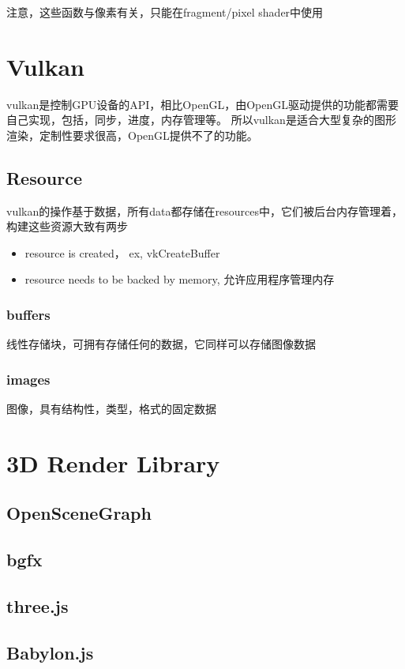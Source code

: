 注意，这些函数与像素有关，只能在fragment/pixel shader中使用

\section{Vulkan}

vulkan是控制GPU设备的API，相比OpenGL，由OpenGL驱动提供的功能都需要自己实现，包括，同步，进度，内存管理等。
所以vulkan是适合大型复杂的图形渲染，定制性要求很高，OpenGL提供不了的功能。

\subsection{Resource}

vulkan的操作基于数据，所有data都存储在resources中，它们被后台内存管理着，构建这些资源大致有两步
\begin{itemize}
    \item {resource is created， ex, vkCreateBuffer}
    \item {resource needs to be backed by memory, 允许应用程序管理内存}
\end{itemize}

\subsubsection{buffers}

线性存储块，可拥有存储任何的数据，它同样可以存储图像数据

\subsubsection{images}

图像，具有结构性，类型，格式的固定数据

\section{3D Render Library}

\subsection{OpenSceneGraph}

\subsection{bgfx}

\subsection{three.js}

\subsection{Babylon.js}
